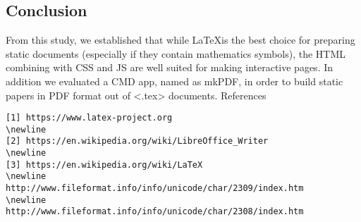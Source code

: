 \documentclass[twocolumn]{article}
\begin{document}
\subsection{Conclusion}
From this study, we established that while \LaTeX is the best choice for
preparing static documents (especially if they contain mathematics symbols), the
HTML combining with CSS and JS are well suited for making interactive pages.
\newline
In addition we evaluated a CMD app, named as mkPDF, in order to build static
papers in PDF format out of <.tex> documents.
\newline
References
\newline
\begin{verbatim}
[1] https://www.latex-project.org
\newline
[2] https://en.wikipedia.org/wiki/LibreOffice_Writer
\newline
[3] https://en.wikipedia.org/wiki/LaTeX
\newline
http://www.fileformat.info/info/unicode/char/2309/index.htm
\newline
http://www.fileformat.info/info/unicode/char/2308/index.htm
\end{verbatim}
\end{document}
